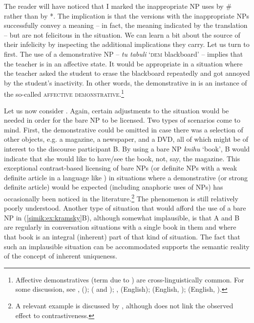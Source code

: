 \documentclass[output=paper,colorlinks,citecolor=brown,newtxmath]{langscibook}
\begin{document}
The reader will have noticed that I marked the inappropriate NP uses by {\#} rather than by *. The implication is that the versions with the inappropriate NPs successfully convey a meaning -- in fact, the meaning indicated by the translation -- but are not felicitous in the situation. We can learn a bit about the source of their infelicity by inspecting the additional implications they carry. Let us turn to  first. The use of a demonstrative NP -- \textit{tu tabuli} `\textsc{dem} blackboard' -- implies that the teacher is in an affective state. It would be appropriate in a situation where the teacher asked the student to erase the blackboard repeatedly and got annoyed by the student's inactivity. In other words, the demonstrative in  is an instance of the so-called \textsc{affective demonstrative}.\footnote{Affective demonstratives (term due to \citealt{Liberman2008}) are cross-linguistically common. For some discussion, see \citet{Mathesius1926}, \citet{Simik2016} (); \citet{Rudin2021} ( and ); \citet{Lakoff1974}, \citet{Liberman2008} (English); \citet{Potts.Schwarz2010} (English, ); \citet{Davis.Potts2010} (English, ).}

Let us now consider . Again, certain adjustments to the situation would be needed in order for the bare NP to be licensed. Two types of scenarios come to mind. First, the demonstrative could be omitted in case there was a selection of other objects, e.g. a magazine, a newspaper, and a DVD, all of which might be of interest to the discourse participant B. By using a bare NP \textit{knihu} `book', B would indicate that she would like to have/see the book, not, say, the magazine. This exceptional contrast-based licensing of bare NPs (or definite NPs with a weak definite article in a language like ) in situations where a demonstrative (or strong definite article) would be expected (including anaphoric uses of NPs) has occasionally been noticed in the literature.\footnote{A relevant  example is discussed by \citet[p. 32, ex. (54)]{Schwarz2009}, although \citeauthor{Schwarz2009} does not link the observed effect to contrastiveness.} The phenomenon is still relatively poorly understood. Another type of situation that would afford the use of a bare NP in (\ref{simik:ex:kramsky}B), although somewhat implausible, is that A and B are regularly in conversation situations with a single book in them and where that book is an integral (inherent) part of that kind of situation. The fact that such an implausible situation can be accommodated supports the semantic reality of the concept of inherent uniqueness.
\end{document}
